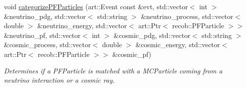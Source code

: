 \begin{DoxyCompactItemize}
\item 
void \hyperlink{group__lee_gae0e0369a28fcbca90d62624f59d44aaa}{categorize\-P\-F\-Particles} (art\-::\-Event const \&evt, std\-::vector$<$ int $>$ \&neutrino\-\_\-pdg, std\-::vector$<$ std\-::string $>$ \&neutrino\-\_\-process, std\-::vector$<$ double $>$ \&neutrino\-\_\-energy, std\-::vector$<$ art\-::\-Ptr$<$ recob\-::\-P\-F\-Particle $>$$>$ \&neutrino\-\_\-pf, std\-::vector$<$ int $>$ \&cosmic\-\_\-pdg, std\-::vector$<$ std\-::string $>$ \&cosmic\-\_\-process, std\-::vector$<$ double $>$ \&cosmic\-\_\-energy, std\-::vector$<$ art\-::\-Ptr$<$ recob\-::\-P\-F\-Particle $>$$>$ \&cosmic\-\_\-pf)
\begin{DoxyCompactList}\small\item\em Determines if a P\-F\-Particle is matched with a M\-C\-Particle coming from a neutrino interaction or a cosmic ray. \end{DoxyCompactList}\end{DoxyCompactItemize}
